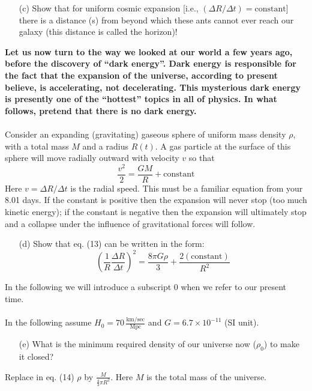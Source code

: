 \documentclass[12pt,a4paper]{article}
\begin{document}
\begin{enumerate}
    \item[(c)]Show that for uniform cosmic expansion [i.e., $(\Delta R/\Delta t)=\text{constant}$] there is a distance (s) from beyond which these ants cannot ever reach our galaxy (this distance is called the horizon)! 
\end{enumerate}
\textbf{Let us now turn to the way we looked at our world a few years ago, before the discovery of “dark energy”. Dark energy is responsible for the fact that the expansion  of the universe, according to present believe, is accelerating, not decelerating. This mysterious dark energy is presently one of the “hottest” topics in all of physics. In what follows, pretend that there is no dark energy.}
\\
\\Consider an expanding (gravitating) gaseous sphere of uniform mass density $\rho$, with a total mass $M$ and a radius $R(t)$. A gas particle at the surface of this sphere will move radially outward with velocity $v$ so that
\begin{equation}
    \frac{v^2}{2}=\frac{GM}{R}+\text{constant}
\end{equation}
Here $v=\Delta R/\Delta t$ is the radial speed.
This must be a familiar equation from your 8.01 days. If the constant is positive then the expansion will never stop (too much kinetic energy); if the constant is negative then the expansion will ultimately stop and a collapse under the influence of gravitational forces will follow.
\begin{enumerate}
    \item[(d)]Show that eq. (13) can be written in the form:
    \begin{equation}
        \left(\frac{1}{R}\frac{\Delta R}{\Delta t}\right)^2=\frac{8\pi G\rho}{3}+\frac{2(\text{constant})}{R^2}
    \end{equation}
\end{enumerate}
In the following we will introduce a subscript 0 when we refer to our present time.
\\
\\In the following assume $H_0=70\,\frac{\text{km/sec}}{\text{Mpc}}$ and $G=6.7\times10^{-11}$ (SI unit).
\begin{enumerate}
    \item[(e)]What is the minimum required density of our universe now ($\rho_0$) to make it closed? 
\end{enumerate}
Replace in eq. (14) $\rho$ by $\frac{M}{\frac{4}{3}\pi R^2}$. Here $M$ is the total mass of the universe.
\end{document}

